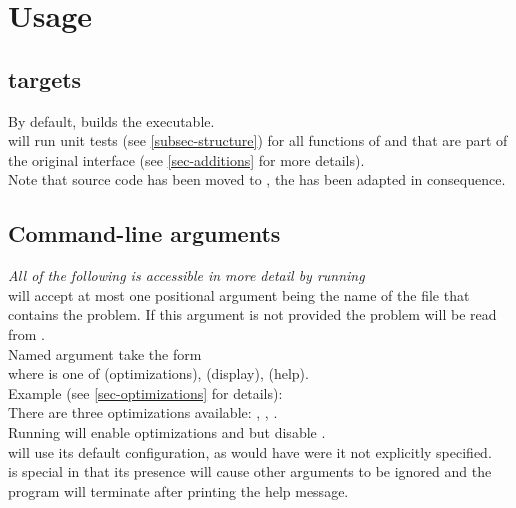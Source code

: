 \section{Usage}\label{sec-usage}

\subsection{ targets}

By default,  builds the  executable.\\
 will run unit tests (see \ref{subsec-structure}) for all functions of
 and  that are part of the original
interface (see \ref{sec-additions} for more details).\\

Note that source code has been moved to , the  has
been adapted in consequence.

\subsection{Command-line arguments}

\textit{All of the following is accessible in more detail by running
}\\

 will accept at most one positional argument being the name of the
file that contains the problem. If this argument is not provided the problem will
be read from .\\

Named argument take the form \ttt{-[CATEGORY][FLAGS]}\\
where  is one of  (optimizations),  (display),
 (help).\\

Example (see \ref{sec-optimizations} for details):\\
There are three optimizations available: , , .\\
Running  will enable optimizations  and 
but disable .\\
 will use its default configuration, as would have  were it not
explicitly specified.\\

 is special in that its presence will cause other arguments to be ignored
and the program will terminate after printing the help message.\\



